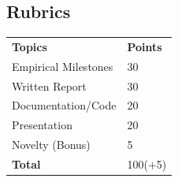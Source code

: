 \documentclass[letta4 paper]{article}
\numberwithin{equation}{section}
\newcommand{\0}{\mathbf{0}}
\begin{document}
	\subsection{Rubrics}
	\begin{table}[h]
		\begin{tabular}{ll}
			\textbf{Topics} & \textbf{Points} \\
			Empirical Milestones &	30 \\
			Written Report &	30 \\
			Documentation/Code &	20 \\
			Presentation &	20 \\
			Novelty (Bonus) &	5 \\
			\textbf{Total} & 100(+5) \\
		\end{tabular}
	\end{table}
	

	
			
\end{document}
